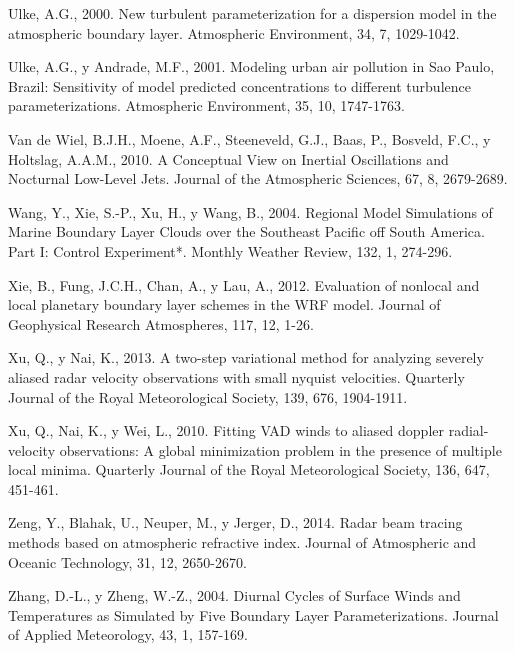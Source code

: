 \documentclass[12pt,spanish,oneside, a4paper]{book}
\begin{document}
\hypertarget{ref-Ulke2000}{}
Ulke, A.G., 2000. New turbulent parameterization for a dispersion model
in the atmospheric boundary layer. Atmospheric Environment, 34, 7,
1029-1042.

\hypertarget{ref-Ulke2001}{}
Ulke, A.G., y Andrade, M.F., 2001. Modeling urban air pollution in Sao
Paulo, Brazil: Sensitivity of model predicted concentrations to
different turbulence parameterizations. Atmospheric Environment, 35, 10,
1747-1763.

\hypertarget{ref-VanDeWiel2010}{}
Van de Wiel, B.J.H., Moene, A.F., Steeneveld, G.J., Baas, P., Bosveld,
F.C., y Holtslag, A.A.M., 2010. A Conceptual View on Inertial
Oscillations and Nocturnal Low-Level Jets. Journal of the Atmospheric
Sciences, 67, 8, 2679-2689.

\hypertarget{ref-Wang2004}{}
Wang, Y., Xie, S.-P., Xu, H., y Wang, B., 2004. Regional Model
Simulations of Marine Boundary Layer Clouds over the Southeast Pacific
off South America. Part I: Control Experiment*. Monthly Weather Review,
132, 1, 274-296.

\hypertarget{ref-Xie2012}{}
Xie, B., Fung, J.C.H., Chan, A., y Lau, A., 2012. Evaluation of nonlocal
and local planetary boundary layer schemes in the WRF model. Journal of
Geophysical Research Atmospheres, 117, 12, 1-26.

\hypertarget{ref-Xu2013}{}
Xu, Q., y Nai, K., 2013. A two-step variational method for analyzing
severely aliased radar velocity observations with small nyquist
velocities. Quarterly Journal of the Royal Meteorological Society, 139,
676, 1904-1911.

\hypertarget{ref-Xu2010}{}
Xu, Q., Nai, K., y Wei, L., 2010. Fitting VAD winds to aliased doppler
radial-velocity observations: A global minimization problem in the
presence of multiple local minima. Quarterly Journal of the Royal
Meteorological Society, 136, 647, 451-461.

\hypertarget{ref-Zeng2014}{}
Zeng, Y., Blahak, U., Neuper, M., y Jerger, D., 2014. Radar beam tracing
methods based on atmospheric refractive index. Journal of Atmospheric
and Oceanic Technology, 31, 12, 2650-2670.

\hypertarget{ref-Zhang2004}{}
Zhang, D.-L., y Zheng, W.-Z., 2004. Diurnal Cycles of Surface Winds and
Temperatures as Simulated by Five Boundary Layer Parameterizations.
Journal of Applied Meteorology, 43, 1, 157-169.
\end{document}
